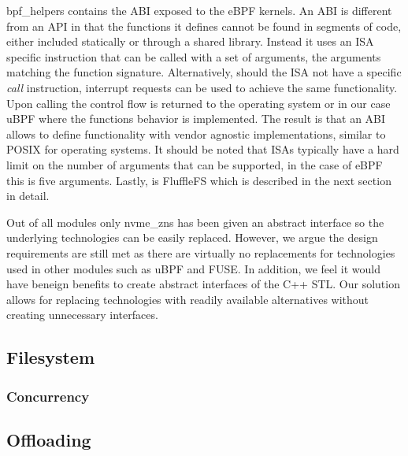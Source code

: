 bpf\_helpers contains the ABI exposed to the eBPF kernels. An ABI is different
from an API in that the functions it defines cannot be found in segments of
code, either included statically or through a shared library. Instead it uses
an ISA specific instruction that can be called with a set of arguments, the
arguments matching the function signature. Alternatively, should the ISA not
have a specific \textit{call} instruction, interrupt requests can be used to
achieve the same functionality. Upon calling the control flow is returned to
the operating system or in our case uBPF where the functions behavior is
implemented. The result is that an ABI allows to define functionality with
vendor agnostic implementations, similar to POSIX for operating systems. It
should be noted that ISAs typically have a hard limit on the number of arguments
that can be supported, in the case of eBPF this is five arguments. Lastly, is
FluffleFS which is described in the next section in detail.

Out of all modules only nvme\_zns has been given an abstract interface so the
underlying technologies can be easily replaced. However, we argue the design
requirements are still met as there are virtually no replacements for
technologies used in other modules such as uBPF and FUSE\footnotemark[10].
In addition, we feel it would have beneign benefits to create abstract
interfaces of the C++ STL. Our solution allows for replacing technologies with
readily available alternatives without creating unnecessary interfaces.


\subsection{Filesystem}


\subsubsection{Concurrency}

\subsection{Offloading}

